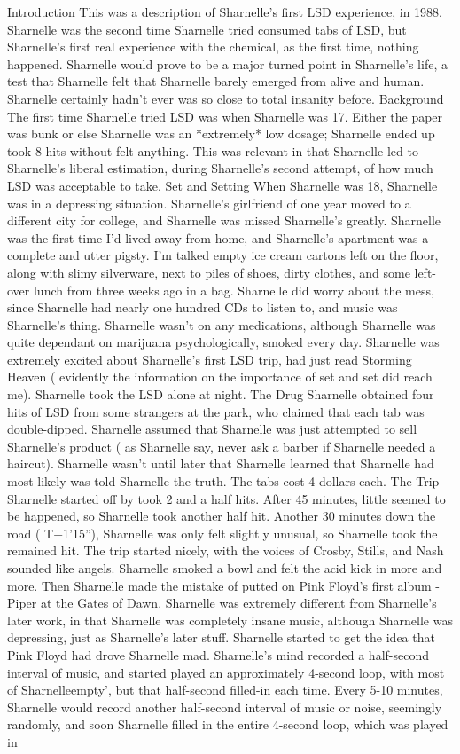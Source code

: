 \documentclass[12pt]{book}
\begin{document}
Introduction This was a description of Sharnelle's first LSD experience, in 1988. Sharnelle was the second time Sharnelle tried consumed tabs of LSD, but Sharnelle's first real experience with the chemical, as the first time, nothing happened. Sharnelle would prove to be a major turned point in Sharnelle's life, a test that Sharnelle felt that Sharnelle barely emerged from alive and human. Sharnelle certainly hadn't ever was so close to total insanity before. Background The first time Sharnelle tried LSD was when Sharnelle was 17. Either the paper was bunk or else Sharnelle was an *extremely* low dosage; Sharnelle ended up took 8 hits without felt anything. This was relevant in that Sharnelle led to Sharnelle's liberal estimation, during Sharnelle's second attempt, of how much LSD was acceptable to take. Set and Setting When Sharnelle was 18, Sharnelle was in a depressing situation. Sharnelle's girlfriend of one year moved to a different city for college, and Sharnelle was missed Sharnelle's greatly. Sharnelle was the first time I'd lived away from home, and Sharnelle's apartment was a complete and utter pigsty. I'm talked empty ice cream cartons left on the floor, along with slimy silverware, next to piles of shoes, dirty clothes, and some left-over lunch from three weeks ago in a bag. Sharnelle did worry about the mess, since Sharnelle had nearly one hundred CDs to listen to, and music was Sharnelle's thing. Sharnelle wasn't on any medications, although Sharnelle was quite dependant on marijuana psychologically, smoked every day. Sharnelle was extremely excited about Sharnelle's first LSD trip, had just read Storming Heaven ( evidently the information on the importance of set and set did reach me). Sharnelle took the LSD alone at night. The Drug Sharnelle obtained four hits of LSD from some strangers at the park, who claimed that each tab was double-dipped. Sharnelle assumed that Sharnelle was just attempted to sell Sharnelle's product ( as Sharnelle say, never ask a barber if Sharnelle needed a haircut). Sharnelle wasn't until later that Sharnelle learned that Sharnelle had most likely was told Sharnelle the truth. The tabs cost 4 dollars each. The Trip Sharnelle started off by took 2 and a half hits. After 45 minutes, little seemed to be happened, so Sharnelle took another half hit. Another 30 minutes down the road ( T+1'15''), Sharnelle was only felt slightly unusual, so Sharnelle took the remained hit. The trip started nicely, with the voices of Crosby, Stills, and Nash sounded like angels. Sharnelle smoked a bowl and felt the acid kick in more and more. Then Sharnelle made the mistake of putted on Pink Floyd's first album - Piper at the Gates of Dawn. Sharnelle was extremely different from Sharnelle's later work, in that Sharnelle was completely insane music, although Sharnelle was depressing, just as Sharnelle's later stuff. Sharnelle started to get the idea that Pink Floyd had drove Sharnelle mad. Sharnelle's mind recorded a half-second interval of music, and started played an approximately 4-second loop, with most of Sharnelleempty', but that half-second filled-in each time. Every 5-10 minutes, Sharnelle would record another half-second interval of music or noise, seemingly randomly, and soon Sharnelle filled in the entire 4-second loop, which was played in 
\end{document}
